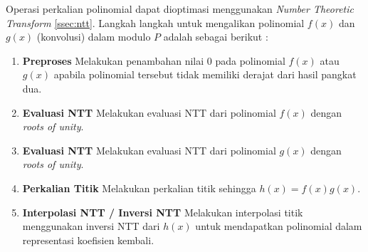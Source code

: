 Operasi perkalian polinomial dapat dioptimasi menggunakan \textit{Number Theoretic Transform} \ref{ssec:ntt}. Langkah langkah untuk mengalikan polinomial $f(x)$ dan $g(x)$ (konvolusi) dalam modulo $ P $ adalah sebagai berikut :
\begin{enumerate}
	\item \textbf{Preproses} Melakukan penambahan nilai 0 pada polinomial $ f(x) $ atau $ g(x) $ apabila polinomial tersebut tidak memiliki derajat dari hasil pangkat dua.
	\item \textbf{Evaluasi NTT} Melakukan evaluasi NTT dari polinomial $ f(x) $ dengan \textit{roots of unity}.
	\item \textbf{Evaluasi NTT} Melakukan evaluasi NTT dari polinomial $ g(x) $ dengan \textit{roots of unity}.
	\item \textbf{Perkalian Titik} Melakukan perkalian titik sehingga $ h(x) = f(x)g(x) $.
	\item \textbf{Interpolasi NTT / Inversi NTT} Melakukan interpolasi titik menggunakan inversi NTT dari $ h(x) $ untuk mendapatkan polinomial dalam representasi koefisien kembali.
\end{enumerate}

